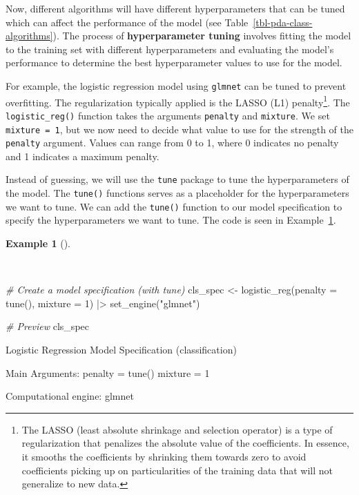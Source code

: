 \documentclass[
  letterpaper,
]{latex/krantz}
\newenvironment{Shaded}{\begin{snugshade}}{\end{snugshade}}
\newcommand{\AttributeTok}[1]{\textcolor[rgb]{0.00,0.00,0.00}{#1}}
\newcommand{\CommentTok}[1]{\textcolor[rgb]{0.00,0.00,0.00}{\textit{#1}}}
\newcommand{\DecValTok}[1]{\textcolor[rgb]{0.00,0.00,0.00}{#1}}
\newcommand{\FunctionTok}[1]{\textcolor[rgb]{0.00,0.00,0.00}{#1}}
\newcommand{\NormalTok}[1]{\textcolor[rgb]{0.00,0.00,0.00}{#1}}
\newcommand{\OtherTok}[1]{\textcolor[rgb]{0.00,0.00,0.00}{#1}}
\newcommand{\SpecialCharTok}[1]{\textcolor[rgb]{0.00,0.00,0.00}{#1}}
\newcommand{\StringTok}[1]{\textcolor[rgb]{0.00,0.00,0.00}{#1}}
\theoremstyle{definition}
\newtheorem{example}{Example}[chapter]
\theoremstyle{remark}
\begin{document}
Now, different algorithms will have different hyperparameters that can
be tuned which can affect the performance of the model (see
Table~\ref{tbl-pda-class-algorithms}). The process of
\textbf{hyperparameter tuning} involves fitting the model to the
training set with different hyperparameters and evaluating the model's
performance to determine the best hyperparameter values to use for the
model.

For example, the logistic regression model using \texttt{glmnet} can be
tuned to prevent overfitting. The regularization typically applied is
the LASSO (L1) penalty\footnote{The LASSO (least absolute shrinkage and
  selection operator) is a type of regularization that penalizes the
  absolute value of the coefficients. In essence, it smooths the
  coefficients by shrinking them towards zero to avoid coefficients
  picking up on particularities of the training data that will not
  generalize to new data.}. The \texttt{logistic\_reg()} function takes
the arguments \texttt{penalty} and \texttt{mixture}. We set
\texttt{mixture\ =\ 1}, but we now need to decide what value to use for
the strength of the \texttt{penalty} argument. Values can range from 0
to 1, where 0 indicates no penalty and 1 indicates a maximum penalty.

Instead of guessing, we will use the \texttt{tune} package to tune the
hyperparameters of the model. The \texttt{tune()} functions serves as a
placeholder for the hyperparameters we want to tune. We can add the
\texttt{tune()} function to our model specification to specify the
hyperparameters we want to tune. The code is seen in
Example~\ref{exm-pda-class-model-spec-tune}.

\begin{example}[]\protect\hypertarget{exm-pda-class-model-spec-tune}{}\label{exm-pda-class-model-spec-tune}

~

\begin{Shaded}
\begin{Highlighting}[]
\CommentTok{\# Create a model specification (with tune)}
\NormalTok{cls\_spec }\OtherTok{\textless{}{-}}
  \FunctionTok{logistic\_reg}\NormalTok{(}\AttributeTok{penalty =} \FunctionTok{tune}\NormalTok{(), }\AttributeTok{mixture =} \DecValTok{1}\NormalTok{) }\SpecialCharTok{|\textgreater{}}
  \FunctionTok{set\_engine}\NormalTok{(}\StringTok{"glmnet"}\NormalTok{)}

\CommentTok{\# Preview}
\NormalTok{cls\_spec}
\end{Highlighting}
\end{Shaded}

\begin{Shaded}
\begin{Highlighting}[]
\NormalTok{Logistic Regression Model Specification (classification)}

\NormalTok{Main Arguments:}
\NormalTok{  penalty = tune()}
\NormalTok{  mixture = 1}

\NormalTok{Computational engine: glmnet}
\end{Highlighting}
\end{Shaded}

\end{example}
\end{document}

